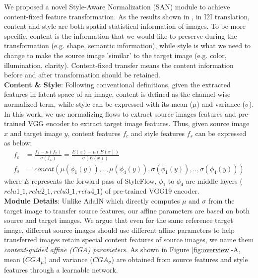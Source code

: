 \documentclass[runningheads]{llncs}
\begin{document}
We proposed a novel Style-Aware Normalization (SAN) module to achieve content-fixed feature transformation. As the results shown in \cite{huang2017arbitrary}, in I2I translation, content and style are both spatial statistical information of images. To be more specific, content is the information that we would like to preserve during the transformation (e.g. shape, semantic information), while style is what we need to change to make the source image 'similar' to the target image (e.g. color, illumination, clarity). Content-fixed transfer means the content information before and after transformation should be retained.\\[1ex]
\noindent\textbf{Content \& Style}:
Following conventional definitions, given the extracted features in latent space of an image, content is defined as the channel-wise normalized term, while style can be expressed with its mean ($\mu$) and variance ($\sigma$). In this work, we use normalizing flows to extract source images features and pre-trained VGG encoder to extract target image features. Thus, given source image $x$ and target image $y$, content features $f_c$ and style features $f_s$ can be expressed as below:
\begin{align}
    f_c &= \frac{f_x - \mu(f_x)}{\sigma(f_x)} = \frac{E(x) - \mu(E(x))}{\sigma(E(x))}\\
    f_s &= concat(\mu({\phi_1(y)}),..,\mu(\phi_4(y)),\sigma({\phi_1(y)}),..,\sigma(\phi_4(y)))
\end{align}
where $E$ represents the forward pass of StyleFlow, $\phi_1$ to $\phi_4$ are middle layers ($relu1\_1,relu2\_1,relu3\_1,relu4\_1$) of pre-trained VGG19 encoder.\\[1ex]
\noindent\textbf{Module Details}: 
Unlike AdaIN\cite{huang2017arbitrary} which directly computes $\mu$ and $\sigma$ from the target image to transfer source features, our affine parameters are based on both source and target images. We argue that even for the same reference target image, different source images should use different affine parameters to help transferred images retain special content features of source images, we name them \textit{content-guided affine (CGA) parameters}. As shown in Figure \ref{fig:overview}-A, mean ($CGA_\mu$) and variance ($CGA_\sigma$) are obtained from source features and style features through a learnable network.
\end{document}
